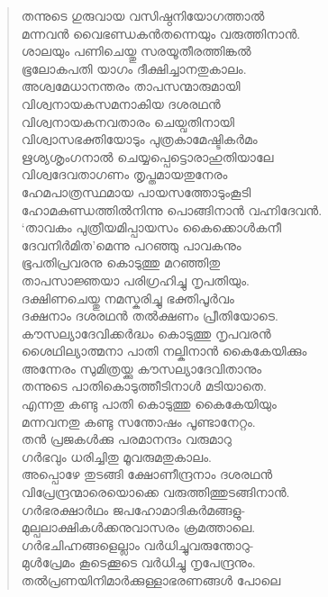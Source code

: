 \begin{verse}
തന്നുടെ ഗുരുവായ വസിഷ്ഠനിയോഗത്താല്‍\\
മന്നവന്‍ വൈഭണ്ഡകന്‍തന്നെയും വരുത്തിനാന്‍.\\
ശാലയും പണിചെയ്തു സരയൂതീരത്തിങ്കല്‍\\
ഭൂലോകപതി യാഗം ദീക്ഷിച്ചാനതുകാലം.\\
അശ്വമേധാനന്തരം താപസന്മാരുമായി\\
വിശ്വനായകസമനാകിയ ദശരഥന്‍\\
വിശ്വനായകനവതാരം ചെയ്വതിനായി\\
വിശ്വാസഭക്തിയോടും പുത്രകാമേഷ്ടികര്‍മം\\
ഋശ്യശൃംഗനാല്‍ ചെയ്യപ്പെട്ടൊരാഹുതിയാലേ\\
വിശ്വദേവതാഗണം തൃപ്തമായതുനേരം\\
ഹേമപാത്രസ്ഥമായ പായസത്തോടുംകൂടി\\
ഹോമകുണ്ഡത്തില്‍നിന്നു പൊങ്ങിനാന്‍ \hbox{വഹ്നിദേവന്‍.}\\
‘താവകം പുത്രീയമിപ്പായസം കൈക്കൊള്‍കനീ\\
ദേവനിര്‍മിത’മെന്നു പറഞ്ഞു പാവകനും\\
ഭൂപതിപ്രവരനു കൊടുത്തു മറഞ്ഞിതു\\
താപസാജ്ഞയാ പരിഗ്രഹിച്ചു നൃപതിയും.\\
ദക്ഷിണചെയ്തു നമസ്കരിച്ചു ഭക്തിപൂര്‍വം\\
ദക്ഷനാം ദശരഥന്‍ തല്‍ക്ഷണം പ്രീതിയോടെ.\\
കൗസല്യാദേവിക്കര്‍ദ്ധം കൊടുത്തു നൃപവരന്‍\\
ശൈഥില്യാത്മനാ പാതി നല്കിനാന്‍ കൈകേയിക്കും\\
അന്നേരം സുമിത്രയ്ക്കു കൗസല്യാദേവിതാനും\\
തന്നുടെ പാതികൊടുത്തീടിനാള്‍ മടിയാതെ.\\
എന്നതു കണ്ടു പാതി കൊടുത്തു കൈകേയിയും\\
മന്നവനതു കണ്ടു സന്തോഷം പൂണ്ടാനേറ്റം.\\
തന്‍ പ്രജകള്‍ക്കു പരമാനന്ദം വരുമാറു\\
ഗര്‍ഭവും ധരിച്ചിതു മൂവരുമതുകാലം.\\
അപ്പൊഴേ തുടങ്ങി ക്ഷോണീന്ദ്രനാം ദശരഥന്‍\\
വിപ്രേന്ദ്രന്മാരെയൊക്കെ വരുത്തിത്തുടങ്ങിനാന്‍.\\
ഗര്‍ഭരക്ഷാര്‍ഥം ജപഹോമാദികര്‍മങ്ങളു-\\
മുല്പലാക്ഷികള്‍ക്കനുവാസരം ക്രമത്താലെ.\\
ഗര്‍ഭചിഹ്നങ്ങളെല്ലാം വര്‍ധിച്ചുവരുന്തോറു-\\
മുള്‍പ്രേമം കൂടെക്കൂടെ വര്‍ധിച്ചു നൃപേന്ദ്രനും.\\
തല്‍പ്രണയിനിമാര്‍ക്കുള്ളാഭരണങ്ങള്‍ പോലെ\\

\end{verse}
